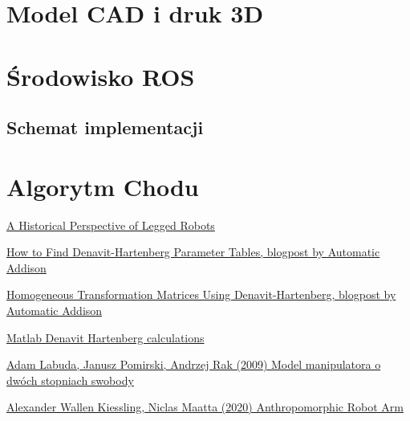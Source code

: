 \documentclass[a4paper,13pt]{article}
\begin{document}
\section{Model CAD i druk 3D}

\section{Środowisko ROS}
\subsection{Schemat implementacji}

\section{Algorytm Chodu}

\begin{thebibliography}{9}

\bibitem{}
\href{https://www.researchgate.net/publication/258995388_A_Historical_Perspective_of_Legged_Robots}{A Historical Perspective of Legged Robots}

\href{https://automaticaddison.com/how-to-find-denavit-hartenberg-parameter-tables/}{How to Find Denavit-Hartenberg Parameter Tables, blogpost by Automatic Addison}

\href{https://automaticaddison.com/homogeneous-transformation-matrices-using-denavit-hartenberg/}{Homogeneous Transformation Matrices Using Denavit-Hartenberg, blogpost by Automatic Addison}

\href{./DH_calculations.m}{Matlab Denavit Hartenberg calculations}

\href{https://sj.umg.edu.pl/sites/default/files/ZN20.pdf}{Adam Labuda, Janusz Pomirski, Andrzej Rak (2009) Model manipulatora o dwóch stopniach swobody}


\bibitem{}
\href{https://www.diva-portal.org/smash/get/diva2:1462059/FULLTEXT01.pdf}{Alexander Wallen Kiessling, Niclas Maatta (2020) Anthropomorphic Robot Arm}

\end{thebibliography}
\end{document}
